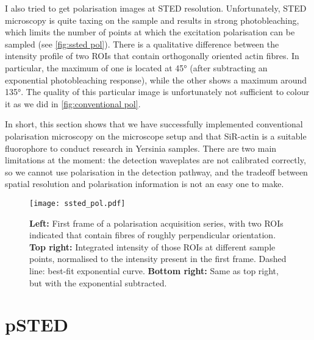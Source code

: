 I also tried to get polarisation images at STED resolution. Unfortunately, STED microscopy is quite taxing on the sample and results in strong photobleaching, which limits the number of points at which the excitation polarisation can be sampled (see \autoref{fig:ssted pol}). There is a qualitative difference between the intensity profile of two ROIs that contain orthogonally oriented actin fibres. In particular, the maximum of one is located at \ang{45} (after subtracting an exponential photobleaching response), while the other shows a maximum around \ang{135}. The quality of this particular image is unfortunately not sufficient to colour it as we did in \autoref{fig:conventional pol}.

In short, this section shows that we have successfully implemented conventional polarisation microscopy on the microscope setup and that SiR-actin is a suitable fluorophore to conduct research in Yersinia samples. There are two main limitations at the moment: the detection waveplates are not calibrated correctly, so we cannot use polarisation in the detection pathway, and the tradeoff between spatial resolution and polarisation information is not an easy one to make. 

\begin{figure}
	\centering
	\texttt{[image: ssted\_pol.pdf]}
	\caption{
		\textbf{Left:} First frame of a polarisation acquisition series, with two ROIs indicated that contain fibres of roughly perpendicular orientation. \textbf{Top right:} Integrated intensity of those ROIs at different sample points, normalised to the intensity present in the first frame. Dashed line: best-fit exponential curve. \textbf{Bottom right:} Same as top right, but with the exponential subtracted.
 	}
 	\label{fig:ssted pol}
\end{figure}

\section{pSTED}

